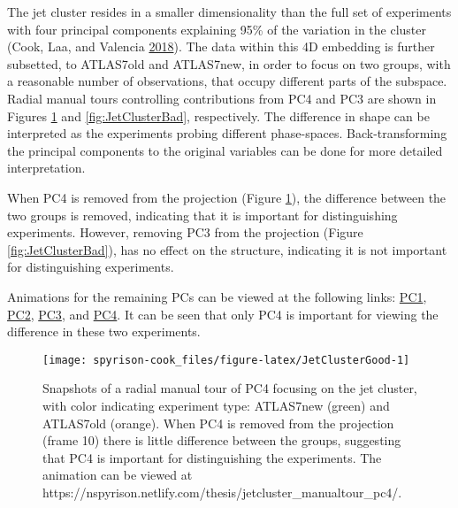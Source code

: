 The jet cluster resides in a smaller dimensionality than the full set of
experiments with four principal components explaining 95\% of the
variation in the cluster (Cook, Laa, and Valencia
\protect\hyperlink{ref-cook_dynamical_2018}{2018}). The data within this
4D embedding is further subsetted, to ATLAS7old and ATLAS7new, in order
to focus on two groups, with a reasonable number of observations, that
occupy different parts of the subspace. Radial manual tours controlling
contributions from PC4 and PC3 are shown in Figures
\ref{fig:JetClusterGood} and \ref{fig:JetClusterBad}, respectively. The
difference in shape can be interpreted as the experiments probing
different phase-spaces. Back-transforming the principal components to
the original variables can be done for more detailed interpretation.

When PC4 is removed from the projection (Figure
\ref{fig:JetClusterGood}), the difference between the two groups is
removed, indicating that it is important for distinguishing experiments.
However, removing PC3 from the projection (Figure
\ref{fig:JetClusterBad}), has no effect on the structure, indicating it
is not important for distinguishing experiments.

Animations for the remaining PCs can be viewed at the following links:
\href{https://nspyrison.netlify.com/thesis/jetcluster_manualtour_pc1/}{PC1},
\href{https://nspyrison.netlify.com/thesis/jetcluster_manualtour_pc2/}{PC2},
\href{https://nspyrison.netlify.com/thesis/jetcluster_manualtour_pc3/}{PC3},
and
\href{https://nspyrison.netlify.com/thesis/jetcluster_manualtour_pc4/}{PC4}.
It can be seen that only PC4 is important for viewing the difference in
these two experiments.

\begin{Schunk}
\begin{figure}

{\centering \texttt{[image: spyrison-cook\_files/figure-latex/JetClusterGood-1]} 

}

\caption[Snapshots of a radial manual tour of PC4 focusing on the jet cluster, with color indicating experiment type]{Snapshots of a radial manual tour of PC4 focusing on the jet cluster, with color indicating experiment type: ATLAS7new (green) and ATLAS7old (orange).  When PC4 is removed from the projection (frame 10) there is little difference between the groups, suggesting that PC4 is important for distinguishing the experiments.  The animation can be viewed at https://nspyrison.netlify.com/thesis/jetcluster\_manualtour\_pc4/.}\label{fig:JetClusterGood}
\end{figure}
\end{Schunk}

